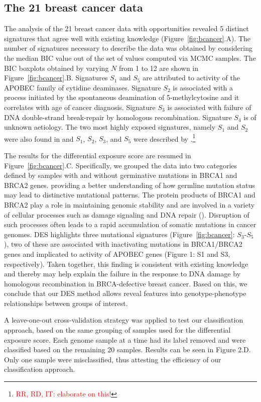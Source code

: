 \documentclass{bioinfo}
\begin{document}
\subsection{The 21 breast cancer data}
The analysis of the 21 breast cancer data with opportunities revealed
5 distinct signatures that agree well with existing knowledge
(Figure~\ref{fig:bcancer}.A).  The number of signatures necessary to
describe the data was obtained by considering the median BIC value out
of the set of values computed via MCMC samples. The BIC boxplots
obtained by varying $N$ from 1 to 12 are shown in
Figure~\ref{fig:bcancer}.B. Signatures $S_1$ and $S_5$ are attributed
to activity of the APOBEC family of cytidine deaminases. Signature
$S_2$ is associated with a process initiated by the spontaneous
deamination of 5-methylcytosine and it correlates with age of cancer
diagnosis. Signature $S_3$ is associated with failure of DNA
double-strand break-repair by homologous recombination.  Signature
$S_4$ is of unknown aetiology. The two most highly exposed signatures,
namely $S_1$ and $S_2$ were also found in \cite{FICMV} and $S_1$,
$S_2$, $S_3$, and $S_5$ were described by
\cite{A}.\footnote{\textcolor{red}{RR, RD, IT: elaborate on this!}}


The results for the differential exposure score are resumed in 
Figure~\ref{fig:bcancer}.C. Specifically, we grouped the data into two
categories defined by samples with and without germinative mutations
in BRCA1 and BRCA2 genes. 
providing a better understanding of how germline mutation status may
lead to distinctive mutational patterns. The protein products of BRCA1
and BRCA2 play a role in maintaining genomic stability and are
involved in a variety of cellular processes such as damage signaling
and DNA repair (\citealp{LY}). Disruption of such processes often
leads to a rapid accumulation of somatic mutations in cancer
genomes. DES highlights three mutational signatures
(Figure~\ref{fig:bcancer}: $S_3$-$S_5$), two of these are associated
with inactivating mutations in BRCA1/BRCA2 genes and
implicated to activity of APOBEC genes (Figure 1: S1 and S3, respectively). Taken
together, this finding is consistent with existing knowledge and
thereby may help explain the failure in the response to DNA damage by
homologous recombination in BRCA-defective breast cancer. Based on
this, we conclude that our DES method allows reveal features into
genotype-phenotype relationships between groups of interest.

A leave-one-out cross-validation strategy was applied to test our 
classification approach, based on the same grouping of samples used 
for the differential exposure score. Each genome sample at a time had 
its label removed and were classified based on the remaining 20 samples. 
Results can be seen in Figure 2.D. Only one sample were misclassified, 
thus attesting the efficiency of our classification approach. 
 
\end{document}
